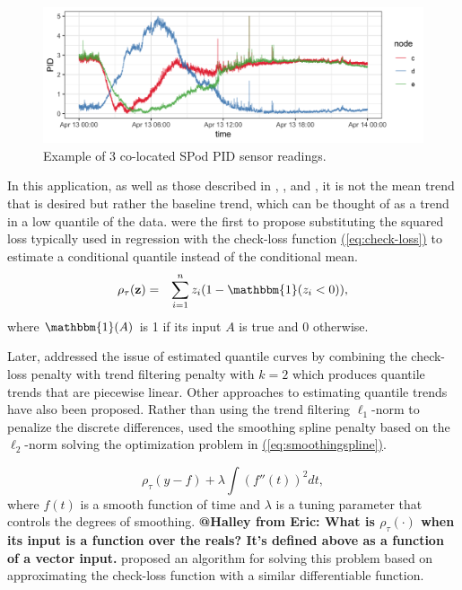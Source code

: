 \documentclass[12pt]{article}
\makeatletter
\newcommand{\Halley}[2]{{\bf {\color{purple}@Halley from #1: #2}}\xspace}
\newcommand{\Eqn}[1]{\hyperref[eq:#1]{{\rm (\ref*{eq:#1})}}} %
\newcommand{\Eqn}[1]{{(\ref{eq:#1})}} %
\newcommand{\One}{\mathbbm{1}}
\newcommand{\V}[1]{{\bm{\mathbf{\MakeLowercase{#1}}}}} %
\makeatother
\begin{document}
	\begin{figure}[b!]
		\includegraphics[width = \linewidth]{Figures/uncorrected_data.png}
		\caption{Example of 3 co-located SPod PID sensor readings.}		
		\label{fig:raw_spod}
	\end{figure}
   	
	In this application, as well as those described in \cite{Ning2014}, \cite{marandi2015qualitative}, and \cite{pettersson2013algorithm}, it is not the mean trend that is desired but rather the baseline trend, which can be thought of as a trend in a low quantile of the data.  \cite{Koenker1978} were the first to propose substituting the squared loss typically used in regression with the check-loss function  \Eqn{check-loss} to estimate a conditional quantile instead of the conditional mean. 
	\begin{eqnarray}
	\label{eq:check-loss}
	 \rho_{\tau}(\V{z}) & = & \sum_{i=1}^n z_i(1-\One(z_i<0)),
	\end{eqnarray}
	where $\One(A)$ is 1 if its input $A$ is true and 0 otherwise.
	
	Later, \cite{KoenkerNgPortnoy1994} addressed the issue of estimated quantile curves by combining the check-loss penalty with trend filtering penalty with $k = 2$ which produces quantile trends that are piecewise linear. Other approaches to estimating quantile trends have also been proposed. Rather than using the trend filtering $\ell_1$-norm to penalize the discrete differences, \cite{nychka1995nonparametric} used the smoothing spline penalty based on the $\ell_2$-norm solving the optimization problem in \Eqn{smoothingspline}. 
	
	\begin{equation*}
	\label{eq:smoothingspline}
	\rho_{\tau}(y - f) + \lambda\int (f''(t))^2 dt, 
 	\end{equation*}
where $f(t)$ is a smooth function of time and $\lambda$ is a tuning parameter that controls the degrees of smoothing. \Halley{Eric}{What is $\rho_{\tau}(\cdot)$ when its input is a function over the reals? It's defined above as a function of a vector input.} \cite{Oh2011} proposed an algorithm for solving this problem based on approximating the check-loss function with a similar differentiable function. 
	
\end{document}
